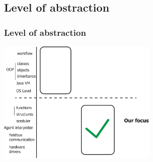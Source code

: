 \documentclass{beamer}
\theoremstyle{definition} \newtheorem{mdefinition}{Definition}
\theoremstyle{plain} \newtheorem{mtheorem}{Theorem}
\theoremstyle{plain} \newtheorem{mcorollary}{Corollary}
\theoremstyle{plain} \newtheorem{mfact}{Fact}
\begin{document}
\subsection{Level of abstraction}
\begin{frame}
\frametitle{Level of abstraction}
\begin{centering}
\includegraphics[width=3in]{img/abstraction-3-eps-converted-to.pdf}
\end{centering}
\end{frame}

\end{document}
